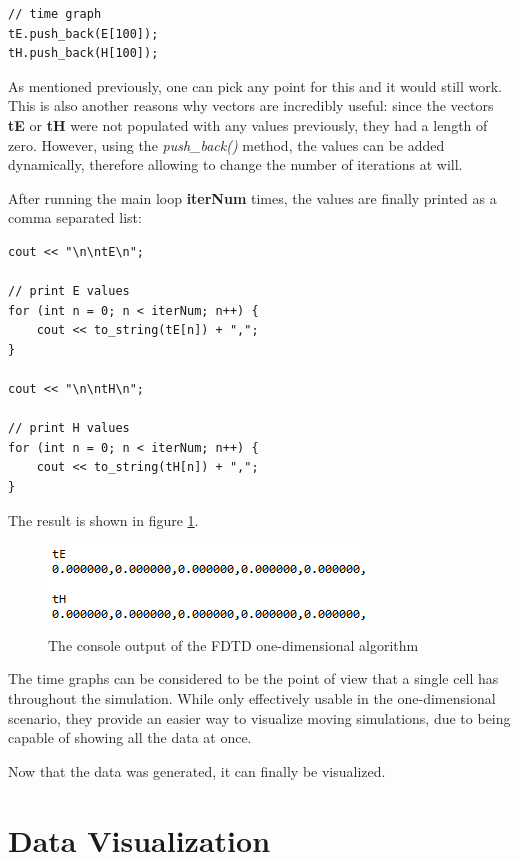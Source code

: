 \begin{verbatim}
// time graph
tE.push_back(E[100]);
tH.push_back(H[100]);
\end{verbatim}

As mentioned previously, one can pick any point for this and it would still work. This is also another reasons why vectors are incredibly useful: since the vectors \textbf{tE} or \textbf{tH} were not populated with any values previously, they had a length of zero. However, using the \textit{push\_back()} method, the values can be added dynamically, therefore allowing to change the number of iterations at will. 

After running the main loop \textbf{iterNum} times, the values are finally printed as a comma separated list:

\begin{verbatim}
cout << "\n\ntE\n";

// print E values
for (int n = 0; n < iterNum; n++) {
	cout << to_string(tE[n]) + ",";
}

cout << "\n\ntH\n";

// print H values
for (int n = 0; n < iterNum; n++) {
	cout << to_string(tH[n]) + ",";
}
\end{verbatim}

The result is shown in figure \ref{fig:fdtd1dconsole}.

\begin{figure}[h!]
	\centering
	\includegraphics{Figures/fdtd1dconsole}
	\decoRule
	\caption[1D Console Output]{The console output of the FDTD one-dimensional algorithm}
	\label{fig:fdtd1dconsole}
\end{figure}

The time graphs can be considered to be the point of view that a single cell has throughout the simulation. While only effectively usable in the one-dimensional scenario, they provide an easier way to visualize moving simulations, due to being capable of showing all the data at once.

Now that the data was generated, it can finally be visualized.

\section{Data Visualization}


